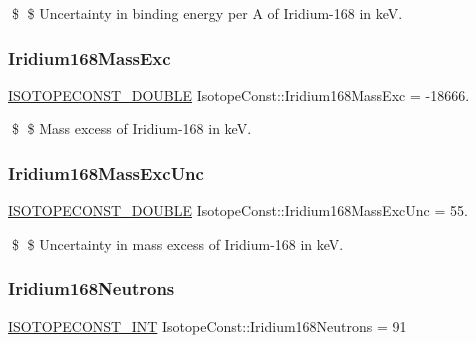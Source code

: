 \$ \$ Uncertainty in binding energy per A of Iridium-\/168 in keV. \mbox{\label{group___isotope_const-_iridium-_ir168_gadd1c15ca4fdebd40ca2f36fa19bca4a6}} 
\subsubsection{\texorpdfstring{Iridium168\+Mass\+Exc}{Iridium168MassExc}}
{\footnotesize\ttfamily \mbox{\hyperlink{group___isotope_const-_macros_ga8f45a7272ce02c0b4c65c44636ed719a}{I\+S\+O\+T\+O\+P\+E\+C\+O\+N\+S\+T\+\_\+\+D\+O\+U\+B\+LE}} Isotope\+Const\+::\+Iridium168\+Mass\+Exc = -\/18666.}

\$ \$ Mass excess of Iridium-\/168 in keV. \mbox{\label{group___isotope_const-_iridium-_ir168_ga846e7aa0cba0fe7274f49ac9354a2177}} 
\subsubsection{\texorpdfstring{Iridium168\+Mass\+Exc\+Unc}{Iridium168MassExcUnc}}
{\footnotesize\ttfamily \mbox{\hyperlink{group___isotope_const-_macros_ga8f45a7272ce02c0b4c65c44636ed719a}{I\+S\+O\+T\+O\+P\+E\+C\+O\+N\+S\+T\+\_\+\+D\+O\+U\+B\+LE}} Isotope\+Const\+::\+Iridium168\+Mass\+Exc\+Unc = 55.}

\$ \$ Uncertainty in mass excess of Iridium-\/168 in keV. \mbox{\label{group___isotope_const-_iridium-_ir168_ga9f1bd4fe239fc37c70cef047806e2b8b}} 
\subsubsection{\texorpdfstring{Iridium168\+Neutrons}{Iridium168Neutrons}}
{\footnotesize\ttfamily \mbox{\hyperlink{group___isotope_const-_macros_ga5f18360b3e99483a35c32d789e62621c}{I\+S\+O\+T\+O\+P\+E\+C\+O\+N\+S\+T\+\_\+\+I\+NT}} Isotope\+Const\+::\+Iridium168\+Neutrons = 91}

